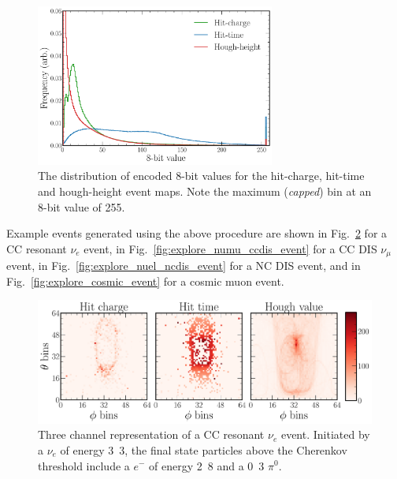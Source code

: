 \begin{figure} %
    \includegraphics[width=0.7\textwidth]{diagrams/6-cvn/chipsnet/explore_8_bit_range.pdf}
    \caption[Event map encoded 8-bit distributions.]
    {The distribution of encoded 8-bit values for the hit-charge, hit-time and hough-height event
        maps. Note the maximum (\emph{capped}) bin at an 8-bit value of 255.}
    \label{fig:explore_8_bit_range}
\end{figure}

Example events generated using the above procedure are shown in
Fig.~\ref{fig:explore_nuel_ccres_event} for a CC resonant $\nu_{e}$ event, in
Fig.~\ref{fig:explore_numu_ccdis_event} for a CC DIS $\nu_{\mu}$ event, in
Fig.~\ref{fig:explore_nuel_ncdis_event} for a NC DIS event, and in
Fig.~\ref{fig:explore_cosmic_event} for a cosmic muon event.

\begin{figure} %
    \includegraphics[width=\textwidth]{diagrams/6-cvn/chipsnet/explore_nuel_ccres_event.pdf}
    \caption[Example of a CC resonant $\nu_{e}$ event.]
    {Three channel representation of a CC resonant $\nu_{e}$ event. Initiated by a $\nu_{e}$ of
        energy \unit{3.3}{\GeV}, the final state particles above the Cherenkov threshold include a
        $e^{-}$ of energy \unit{2.8}{\GeV} and a \unit{0.3}{\GeV} $\pi^{0}$.}
    \label{fig:explore_nuel_ccres_event}
\end{figure}


